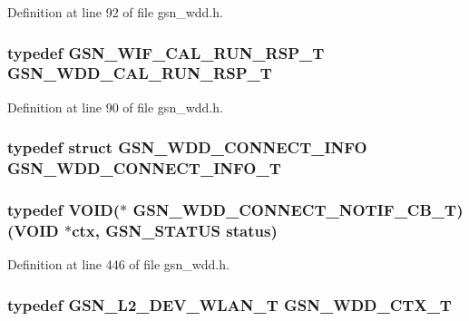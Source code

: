 Definition at line 92 of file gsn\_\-wdd.h.

\hypertarget{a00603_ae439d00fb6368eda8ceae5f7bbae3b95}{
\subsubsection[{GSN\_\-WDD\_\-CAL\_\-RUN\_\-RSP\_\-T}]{\setlength{\rightskip}{0pt plus 5cm}typedef {\bf GSN\_\-WIF\_\-CAL\_\-RUN\_\-RSP\_\-T} {\bf GSN\_\-WDD\_\-CAL\_\-RUN\_\-RSP\_\-T}}}
\label{a00603_ae439d00fb6368eda8ceae5f7bbae3b95}


Definition at line 90 of file gsn\_\-wdd.h.

\hypertarget{a00603_a99522d8b9d2419985efa523af3c9c00d}{
\subsubsection[{GSN\_\-WDD\_\-CONNECT\_\-INFO\_\-T}]{\setlength{\rightskip}{0pt plus 5cm}typedef struct {\bf GSN\_\-WDD\_\-CONNECT\_\-INFO} {\bf GSN\_\-WDD\_\-CONNECT\_\-INFO\_\-T}}}
\label{a00603_a99522d8b9d2419985efa523af3c9c00d}
\hypertarget{a00603_afa291ab10917d97cae6b9207522e623b}{
\subsubsection[{GSN\_\-WDD\_\-CONNECT\_\-NOTIF\_\-CB\_\-T}]{\setlength{\rightskip}{0pt plus 5cm}typedef VOID($\ast$ {\bf GSN\_\-WDD\_\-CONNECT\_\-NOTIF\_\-CB\_\-T})(VOID $\ast$ctx, {\bf GSN\_\-STATUS} status)}}
\label{a00603_afa291ab10917d97cae6b9207522e623b}


Definition at line 446 of file gsn\_\-wdd.h.

\hypertarget{a00603_ab461c9df9fc979702c542cabffbb2dba}{
\subsubsection[{GSN\_\-WDD\_\-CTX\_\-T}]{\setlength{\rightskip}{0pt plus 5cm}typedef {\bf GSN\_\-L2\_\-DEV\_\-WLAN\_\-T} {\bf GSN\_\-WDD\_\-CTX\_\-T}}}
\label{a00603_ab461c9df9fc979702c542cabffbb2dba}


